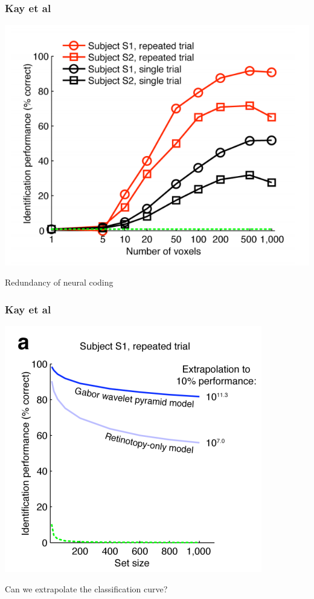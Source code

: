 \documentclass{beamer}
\begin{document}
\begin{frame}
\frametitle{Kay et al}
\begin{center}
\includegraphics[scale=0.3]{kay_s4.png}
\end{center}
Redundancy of neural coding
\end{frame}

\begin{frame}
\frametitle{Kay et al}
\begin{center}
\includegraphics[scale=0.4]{kay_s5.png}
\end{center}
Can we extrapolate the classification curve?
\end{frame}
\end{document}
